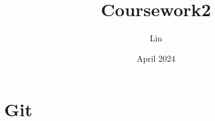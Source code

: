 \documentclass{article}
\title{Coursework2}
\author{Lin}
\date{April 2024}
\begin{document}
\maketitle

\section{Git}
\end{document}
